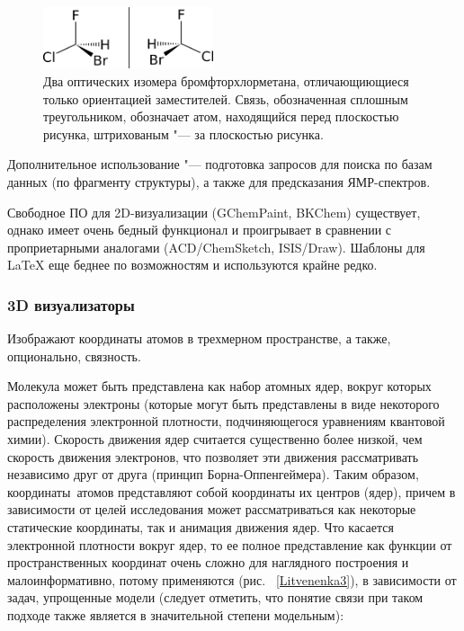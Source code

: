 \documentclass[10pt, a5paper]{article}
\begin{document}
\begin{figure}[h!]
  \centering
  \includegraphics[width=5cm]{20_2016_Litvenenka2.png}
  \caption{Два оптических изомера бромфторхлорметана, отличающиющиеся только ориентацией заместителей. Связь, обозначенная сплошным треугольником, обозначает атом, находящийся перед плоскостью рисунка, штрихованым "--- за плоскостью рисунка.}
  \label{Litvenenka2}
\end{figure}

Дополнительное использование "--- подготовка запросов для поиска по базам данных (по фрагменту структуры), а также для предсказания ЯМР-спектров.

Свободное ПО для 2D-визуализации (GChemPaint, BKChem) существует, однако имеет очень бедный функционал и проигрывает в сравнении с проприетарными аналогами (ACD/ChemSketch, ISIS/Draw). Шаблоны для LaTeX еще беднее по возможностям и используются крайне редко.

\subsubsection*{3D визуализаторы}

Изображают координаты атомов в трехмерном пространстве, а также, опционально, связность.

Молекула может быть представлена как набор атомных ядер, вокруг которых расположены электроны (которые могут быть представлены в виде некоторого распределения электронной плотности, подчиняющегося уравнениям квантовой химии). Скорость движения ядер считается существенно более низкой, чем скорость движения электронов, что позволяет эти движения рассматривать независимо друг от друга (принцип Борна-Оппенгеймера). Таким образом, координаты атомов представляют собой координаты их центров (ядер), причем в зависимости от целей исследования может рассматриваться как некоторые статические координаты, так и анимация движения ядер. Что касается электронной плотности вокруг ядер, то ее полное представление как функции от пространственных координат очень сложно для наглядного построения и малоинформативно, потому применяются (рис. ~\ref{Litvenenka3}), в зависимости от задач, упрощенные модели (следует отметить, что понятие связи при таком подходе также является в значительной степени модельным):
\end{document}
